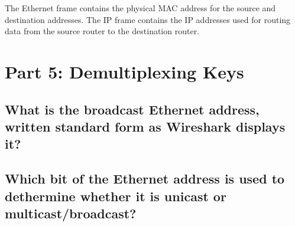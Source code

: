 \documentclass{article}
\begin{document}
    The Ethernet frame contains the physical MAC address for the source and destination addresses. The IP frame contains the IP addresses used for routing data from the source router to the destination router.

    \clearpage
    \section*{Part 5: Demultiplexing Keys}
    \subsection{What is the broadcast Ethernet address, written standard form as Wireshark displays it?}

    \subsection{Which bit of the Ethernet address is used to dethermine whether it is unicast or multicast/broadcast?}
\end{document}
